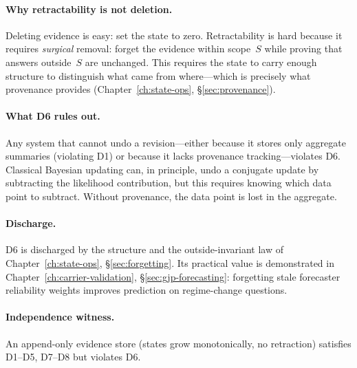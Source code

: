 \documentclass[11pt,openany]{report}
\begin{document}
\paragraph{Why retractability is not deletion.}
Deleting evidence is easy: set the state to zero.  Retractability is
hard because it requires \emph{surgical} removal: forget the evidence
within scope~$S$ while proving that answers outside~$S$ are unchanged.
This requires the state to carry enough structure to distinguish what
came from where---which is precisely what provenance provides
(Chapter~\ref{ch:state-ops}, \S\ref{sec:provenance}).

\paragraph{What D6 rules out.}
Any system that cannot undo a revision---either because it stores only
aggregate summaries (violating D1) or because it lacks provenance
tracking---violates D6.  Classical Bayesian updating can, in principle,
undo a conjugate update by subtracting the likelihood contribution,
but this requires knowing which data point to subtract.  Without
provenance, the data point is lost in the aggregate.

\paragraph{Discharge.}
D6 is discharged by the  structure and the
outside-invariant law of Chapter~\ref{ch:state-ops},
\S\ref{sec:forgetting}.  Its practical value is demonstrated in
Chapter~\ref{ch:carrier-validation}, \S\ref{sec:gjp-forecasting}:
forgetting stale forecaster reliability weights improves
prediction on regime-change questions.

\paragraph{Independence witness.}
An append-only evidence store (states grow monotonically, no
retraction) satisfies D1--D5, D7--D8 but violates D6.

\end{document}

